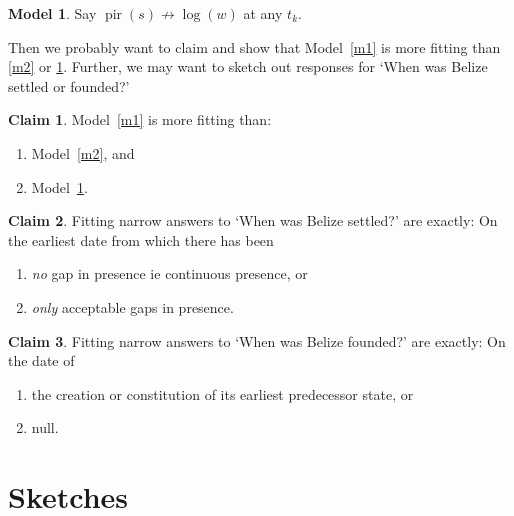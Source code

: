 \documentclass{amsart}
\DeclareMathOperator{\pir}{pir}%
\theoremstyle{definition}%
\newtheorem{model}{Model}
\theoremstyle{definition}%
\newtheorem{claim}{Claim}
\begin{document}
%
%
\begin{model}
\label{m3}
Say \(\pir(s)\not\to\log(w)\) at any \(t_{k}\). %
\end{model}
%
%
Then we probably want to claim and show that Model~\ref{m1} is more fitting than \ref{m2} or \ref{m3}. %
Further, we may want to sketch out responses for `When was Belize settled or founded?'%
%
%
\begin{claim}
\label{c1}
Model~\ref{m1} is more fitting than: 
\begin{enumerate}
\item Model~\ref{m2}, and 
\item Model~\ref{m3}.
\end{enumerate}
\end{claim}
%
%
\begin{claim}
\label{c2}
Fitting narrow answers to `When was Belize settled?' are exactly: On the earliest date from which there has been%
\begin{enumerate}
\item \emph{no} gap in presence ie continuous presence, or%
\item \emph{only} acceptable gaps in presence.%
\end{enumerate}
\end{claim}
%
%
\begin{claim}
\label{c3}
Fitting narrow answers to `When was Belize founded?' are exactly: On the date of
\begin{enumerate}
\item the creation or constitution of its earliest predecessor state, or%
\item null.
\end{enumerate}
\end{claim}
%
%
%
%
\section{Sketches}
\label{s:sketches}
%
%
%
%
\end{document}
